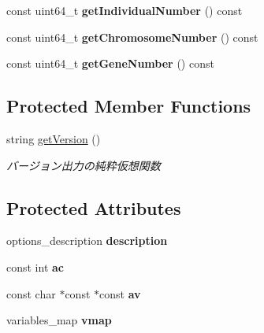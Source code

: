 \begin{DoxyCompactItemize}
\item 
\mbox{\label{class_g_a_1_1_options_a5c530fdecc7fd52b489f0b22dde66690}} 
const uint64\+\_\+t {\bfseries get\+Individual\+Number} () const
\item 
\mbox{\label{class_g_a_1_1_options_a031bbb8da0909142db58c05007b3b156}} 
const uint64\+\_\+t {\bfseries get\+Chromosome\+Number} () const
\item 
\mbox{\label{class_g_a_1_1_options_a0731390ca7c6122ef353dcc364078ec2}} 
const uint64\+\_\+t {\bfseries get\+Gene\+Number} () const
\end{DoxyCompactItemize}
\subsection*{Protected Member Functions}
\begin{DoxyCompactItemize}
\item 
\mbox{\label{class_g_a_1_1_options_a8ed5817b7aa19cd6d6797552b335f2b6}} 
string \mbox{\hyperlink{class_g_a_1_1_options_a8ed5817b7aa19cd6d6797552b335f2b6}{get\+Version}} ()
\begin{DoxyCompactList}\small\item\em バージョン出力の純粋仮想関数 \end{DoxyCompactList}\end{DoxyCompactItemize}
\subsection*{Protected Attributes}
\begin{DoxyCompactItemize}
\item 
\mbox{\label{class_g_a_1_1_options_a20669586e0f3b564d5d94c93b677f050}} 
options\+\_\+description {\bfseries description}
\item 
\mbox{\label{class_g_a_1_1_options_a3049a68a6be9163941d290a3c814bb95}} 
const int {\bfseries ac}
\item 
\mbox{\label{class_g_a_1_1_options_af173d38c599bb7a18936fa789cf20834}} 
const char $\ast$const  $\ast$const {\bfseries av}
\item 
\mbox{\label{class_g_a_1_1_options_a3def8dc5a8eb71dfcfa4361904077628}} 
variables\+\_\+map {\bfseries vmap}
\end{DoxyCompactItemize}
